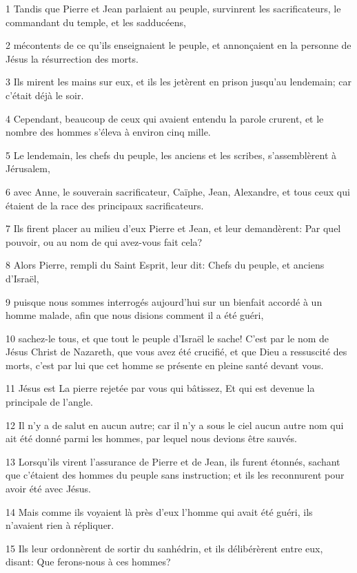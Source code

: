 \par 1 Tandis que Pierre et Jean parlaient au peuple, survinrent les sacrificateurs, le commandant du temple, et les sadducéens,
\par 2 mécontents de ce qu'ils enseignaient le peuple, et annonçaient en la personne de Jésus la résurrection des morts.
\par 3 Ils mirent les mains sur eux, et ils les jetèrent en prison jusqu'au lendemain; car c'était déjà le soir.
\par 4 Cependant, beaucoup de ceux qui avaient entendu la parole crurent, et le nombre des hommes s'éleva à environ cinq mille.
\par 5 Le lendemain, les chefs du peuple, les anciens et les scribes, s'assemblèrent à Jérusalem,
\par 6 avec Anne, le souverain sacrificateur, Caïphe, Jean, Alexandre, et tous ceux qui étaient de la race des principaux sacrificateurs.
\par 7 Ils firent placer au milieu d'eux Pierre et Jean, et leur demandèrent: Par quel pouvoir, ou au nom de qui avez-vous fait cela?
\par 8 Alors Pierre, rempli du Saint Esprit, leur dit: Chefs du peuple, et anciens d'Israël,
\par 9 puisque nous sommes interrogés aujourd'hui sur un bienfait accordé à un homme malade, afin que nous disions comment il a été guéri,
\par 10 sachez-le tous, et que tout le peuple d'Israël le sache! C'est par le nom de Jésus Christ de Nazareth, que vous avez été crucifié, et que Dieu a ressuscité des morts, c'est par lui que cet homme se présente en pleine santé devant vous.
\par 11 Jésus est La pierre rejetée par vous qui bâtissez, Et qui est devenue la principale de l'angle.
\par 12 Il n'y a de salut en aucun autre; car il n'y a sous le ciel aucun autre nom qui ait été donné parmi les hommes, par lequel nous devions être sauvés.
\par 13 Lorsqu'ils virent l'assurance de Pierre et de Jean, ils furent étonnés, sachant que c'étaient des hommes du peuple sans instruction; et ils les reconnurent pour avoir été avec Jésus.
\par 14 Mais comme ils voyaient là près d'eux l'homme qui avait été guéri, ils n'avaient rien à répliquer.
\par 15 Ils leur ordonnèrent de sortir du sanhédrin, et ils délibérèrent entre eux, disant: Que ferons-nous à ces hommes?
